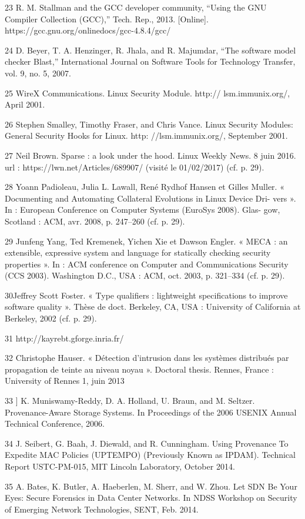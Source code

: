 \documentclass{IEEEtran}
\begin{document}
\begin{thebibliography}{00}
23 R. M. Stallman and the GCC developer community, “Using the
GNU Compiler Collection (GCC),” Tech. Rep., 2013. [Online].
https://gcc.gnu.org/onlinedocs/gcc-4.8.4/gcc/

24 D. Beyer, T. A. Henzinger, R. Jhala, and R. Majumdar, “The software
model checker Blast,” International Journal on Software Tools for
Technology Transfer, vol. 9, no. 5, 2007.

25 WireX Communications. Linux Security Module. http://
lsm.immunix.org/, April 2001.

26 Stephen Smalley, Timothy Fraser, and Chris Vance. Linux Security Modules: General Security Hooks for Linux. http:
//lsm.immunix.org/, September 2001.

27 Neil Brown. Sparse : a look under the hood. Linux Weekly News. 8 juin 2016.
url : https://lwn.net/Articles/689907/ (visité le 01/02/2017) (cf. p. 29).

28 Yoann Padioleau, Julia L. Lawall, René Rydhof Hansen et Gilles Muller.
« Documenting and Automating Collateral Evolutions in Linux Device Dri-
vers ». In : European Conference on Computer Systems (EuroSys 2008). Glas-
gow, Scotland : ACM, avr. 2008, p. 247–260 (cf. p. 29).

29 Junfeng Yang, Ted Kremenek, Yichen Xie et Dawson Engler. « MECA : an
extensible, expressive system and language for statically checking security
properties ». In : ACM conference on Computer and Communications Security
(CCS 2003). Washington D.C., USA : ACM, oct. 2003, p. 321–334 (cf. p. 29).

30Jeffrey Scott Foster. « Type qualifiers : lightweight specifications to improve
software quality ». Thèse de doct. Berkeley, CA, USA : University of California
at Berkeley, 2002 (cf. p. 29).

31 http://kayrebt.gforge.inria.fr/

32 Christophe Hauser. « Détection d’intrusion dans les systèmes distribués par
propagation de teinte au niveau noyau ». Doctoral thesis. Rennes, France :
University of Rennes 1, juin 2013

33 ] K. Muniswamy-Reddy, D. A. Holland, U. Braun, and M. Seltzer.
Provenance-Aware Storage Systems. In Proceedings of the 2006
USENIX Annual Technical Conference, 2006.

34 J. Seibert, G. Baah, J. Diewald, and R. Cunningham. Using
Provenance To Expedite MAC Policies (UPTEMPO) (Previously
Known as IPDAM). Technical Report USTC-PM-015, MIT Lincoln Laboratory, October 2014.

35 A. Bates, K. Butler, A. Haeberlen, M. Sherr, and W. Zhou. Let
SDN Be Your Eyes: Secure Forensics in Data Center Networks.
In NDSS Workshop on Security of Emerging Network Technologies, SENT, Feb. 2014.


\end{thebibliography}
\end{document}
